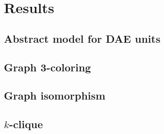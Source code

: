 \chapter{Results}

\section{Abstract model for DAE units}




\section{Graph 3-coloring}




\newpage
\section{Graph isomorphism}




\newpage
\section{$k$-clique}


